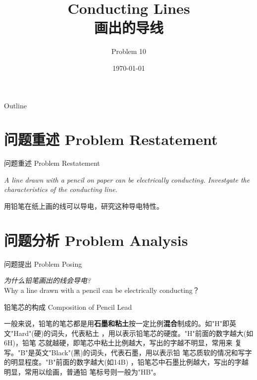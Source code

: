 \documentclass[10pt]{beamer}
\title[画出的导线 Conducting Lines]{Conducting Lines\\画出的导线}
\author{Problem 10}
\institute[BIT]{Number： 1017}
\date{\today}
\begin{document}
	\begin{frame}
		\titlepage
	\end{frame}
	
	
	\begin{frame}{Outline}
		\tableofcontents
	\end{frame}
	
	
	\section[问题重述 Problem Restatement]{问题重述 Problem Restatement}
	\begin{frame}{问题重述 Problem Restatement}
		\begin{center}
			\textit{\Large A line drawn with a pencil on paper can be electrically conducting. Investgate the characteristics of the conducting line.}
			
			\bigskip
			{\large 用铅笔在纸上画的线可以导电，研究这种导电特性。}
		\end{center}
	\end{frame}
	
	
	\section{问题分析 Problem Analysis}
	\begin{frame}{问题提出 Problem Posing}
		\begin{center}
			{\LARGE  \textit{为什么铅笔画出的线会导电?}}\\
			\large Why a line drawn with
			a pencil can be electrically conducting？
			
		\end{center}
	\end{frame}
	
	\begin{frame}{铅笔芯的构成 Composition of Pencil Lead}
		
		\qquad     一般来说，铅笔的笔芯都是用\textbf{石墨和粘土}按一定比例\textbf{混合}制成的。如"H"即英文"Hard"(硬)的词头，代表粘土
		，用以表示铅笔芯的硬度。"H"前面的数字越大(如6H)，铅笔
		芯就越硬，即笔芯中粘土比例越大，写出的字越不明显，常用来
		复写。"B"是英文"Black"(黑)的词头，代表石墨，用以表示铅
		笔芯质软的情况和写字的明显程度。"B"前面的数字越大(如14B)
		，铅笔芯中石墨比例越大，写出的字越明显，常用以绘画，普通铅
		笔标号则一般为"HB"。
	\end{frame}
	
\end{document}
